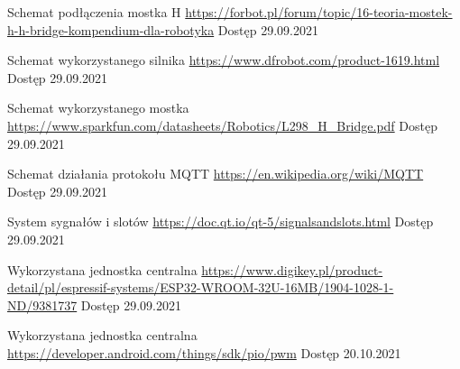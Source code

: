 \begin{thebibliography}{9}
        Schemat podłączenia mostka H  \newline
        \url{https://forbot.pl/forum/topic/16-teoria-mostek-h-h-bridge-kompendium-dla-robotyka} \newline
        Dostęp 29.09.2021         
        
        Schemat wykorzystanego silnika  \newline
        \url{https://www.dfrobot.com/product-1619.html} \newline
        Dostęp 29.09.2021
                
        Schemat wykorzystanego mostka  \newline
        \url{https://www.sparkfun.com/datasheets/Robotics/L298_H_Bridge.pdf} \newline
        Dostęp 29.09.2021
        
        Schemat działania protokołu MQTT  \newline
        \url{https://en.wikipedia.org/wiki/MQTT} \newline
        Dostęp 29.09.2021
        
        System sygnałów i slotów \newline
        \url{https://doc.qt.io/qt-5/signalsandslots.html} \newline
        Dostęp 29.09.2021
        
        Wykorzystana jednostka centralna \newline
        \url{https://www.digikey.pl/product-detail/pl/espressif-systems/ESP32-WROOM-32U-16MB/1904-1028-1-ND/9381737} \newline
        Dostęp 29.09.2021
        
        Wykorzystana jednostka centralna \newline
        \url{https://developer.android.com/things/sdk/pio/pwm} \newline
        Dostęp 20.10.2021

  \end{thebibliography}
  
  